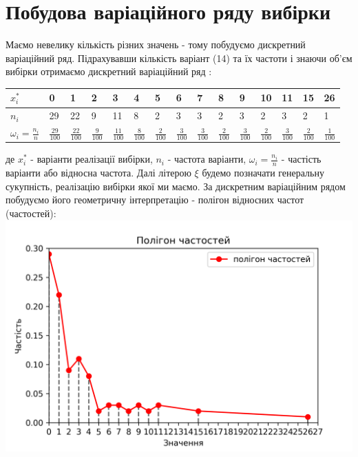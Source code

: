 \documentclass{article}
\begin{document}
\section{Побудова варіаційного ряду вибірки }
Маємо невелику кількість різних значень - тому побудуємо 
дискретний варіаційний ряд.
Підрахувавши кількість варіант (14) та їх частоти і знаючи 
об’єм вибірки отримаємо 
дискретний варіаційний ряд :
\newline
\newline
\begin{tabular}{|l|l|l|l|l|l|l|l|l|l|l|l|l|l|l|}
  \hline
  $x_i^*$& 0 & 1 & 2 & 3 & 4 & 5 & 6 & 7 & 8 & 9 & 10 & 11 & 15 & 26\\
  \hline
  $n_i$& 29 & 22 & 9 & 11 & 8 & 2 & 3 & 3 & 2 & 3 & 2 & 3 & 2 & 1\\
  \hline
  $\omega_i = \frac{n_i}{n}$ & $\frac{29}{100}$ & 
  $\frac{22}{100}$ & $\frac{9}{100}$ & $\frac{11}{100}$ & 
  $\frac{8}{100}$ & $\frac{2}{100}$ & $\frac{3}{100}$ 
  & $\frac{3}{100}$ & $\frac{2}{100}$ & $\frac{3}{100}$ & 
  $\frac{2}{100}$ & $\frac{3}{100}$ & $\frac{2}{100}$ & 
  $\frac{1}{100}$\\
  \hline
\end{tabular}
\newline
\newline
де $x_i^*$ - варіанти реалізації вибірки, $n_i$ - частота 
варіанти, $\omega_i = \frac{n_i}{n}$ - частість варіанти або 
відносна частота.
\newline
\newline
Далі літерою $\xi$ будемо позначати генеральну сукупність, 
реалізацію вибірки якої ми маємо.
\newpage
За дискретним варіаційним рядом побудуємо його геометричну 
інтерпретацію - полігон відносних частот (частостей):
\newline
\includegraphics[scale = 0.9]{plot}
\end{document}
